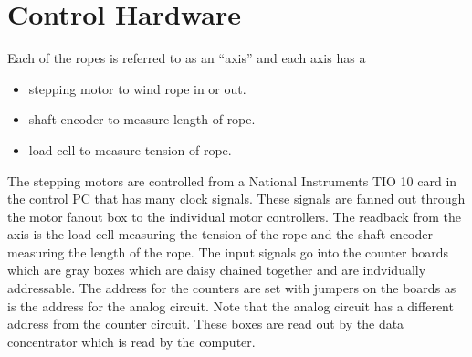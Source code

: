 \section{Control Hardware}
 
  
  
  
  Each of the ropes is referred to as an ``axis'' and each axis has a
\begin{itemize}
\item stepping motor to wind rope in or out.
\item shaft encoder to measure length of rope.
\item load cell to measure tension of rope.
\end{itemize}
The stepping motors are controlled from a National Instruments TIO 10 card
in the control PC that has many clock signals.  These signals are fanned
out through the motor fanout box to the individual motor controllers.
The readback from the axis is the load cell measuring the tension of the
rope and the shaft encoder measuring the length of the rope.  The input
signals go into the counter boards which are gray boxes 
which are daisy chained together and are indvidually 
addressable.    The address for the counters are set with jumpers on 
the boards as is the address for the analog circuit.  Note that the
analog circuit has a different address from the counter circuit.
These boxes are read out by the data concentrator which is
read by the computer.
  
